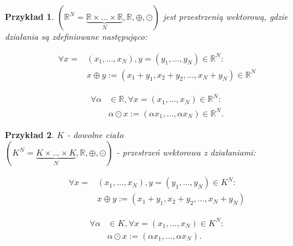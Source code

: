 \documentclass[a5paper,8pt]{article}
\newtheorem{example}{Przykład}[section]
\begin{document}
    \begin{example}
        \hfill \break
        $ (\mathbb{R}^N = \underbrace{\mathbb{R} \times \ldots \times \mathbb{R}}_{N}, \mathbb{R}, \oplus, \odot) $ jest przestrzenią wektorową, gdzie działania są zdefiniowane następująco:

        \begin{equation*}
            \begin{split}
                \forall  x ={} & ( x_1, \ldots, x_N), y = (y_1, \ldots,y_N) \in \mathbb{R}^N: \\
                & x \oplus y := (x_1+y_1,x_2+y_2,\ldots,x_N+y_N) \in \mathbb{R}^N
            \end{split}
        \end{equation*}

        \begin{equation*}
            \begin{split}
                \forall  \alpha{} & \in \mathbb{R}, \forall x = ( x_1, \ldots, x_N) \in \mathbb{R}^N: \\
                & \alpha \odot x := (\alpha x_1,\ldots,\alpha x_N) \in \mathbb{R}^N.
            \end{split}
        \end{equation*}
    \end{example}


    \begin{example}
        \hfill \break
        $ K $ - dowolne ciało \\
        $ (K^N = \underbrace{K \times \ldots \times K}_{N}, \mathbb{R}, \oplus, \odot) $ - przestrzeń wektorowa z działaniami:

        \begin{equation*}
            \begin{split}
                \forall  x ={} & ( x_1, \ldots, x_N), y = (y_1, \ldots,y_N) \in K^N: \\
                & x \oplus y := (x_1+y_1,x_2+y_2,\ldots,x_N+y_N)
            \end{split}
        \end{equation*}

        \begin{equation*}
            \begin{split}
                \forall  \alpha{} & \in K, \forall x = ( x_1, \ldots, x_N) \in K^N: \\
                & \alpha \odot x := (\alpha x_1,\ldots,\alpha x_N).
            \end{split}
        \end{equation*}
    \end{example}
\end{document}
